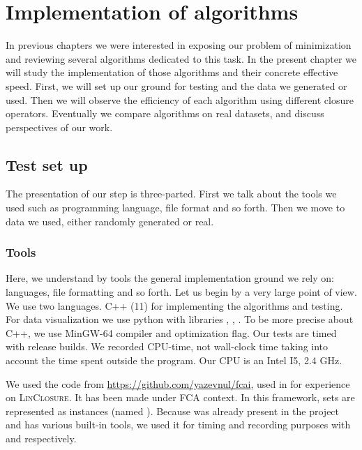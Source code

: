 \chapter{Implementation of algorithms}

In previous chapters we were interested in exposing our problem of minimization
and reviewing several algorithms dedicated to this task. In the present chapter we will study the implementation of those algorithms and their concrete effective speed. First, we will set up our ground for testing and the data we generated or used. Then we will observe the efficiency of each algorithm using 
different closure operators. Eventually we compare algorithms on real datasets,
and discuss perspectives of our work.

\section{Test set up}

The presentation of our step is three-parted. First we talk about the tools we used such as programming language, file format and so forth. Then we move to 
data we used, either randomly generated or real.

\subsection{Tools}

Here, we understand by tools the general implementation ground we rely on:
languages, file formatting and so forth. Let us begin by
a very large point of view. We use two languages. C++ (11) for implementing
the algorithms and testing. For data visualization we use python with libraries , , . To be more precise about C++, 
we use MinGW-64 compiler and  optimization flag. Our tests are timed
with release builds. We recorded CPU-time, not wall-clock time taking into account the time spent outside the program. Our CPU is an Intel I5, 2.4 GHz.

\vspace{1.2em}

We used the code from \url{https://github.com/yazevnul/fcai}, used in 
\cite{bazhanov_optimizations_2014} for experience on \textsc{LinClosure}. It has been made under FCA context. In this framework, sets are represented as  instances (named ). Because 
was already present in the project and has various built-in tools, we used it
for timing and recording purposes with  and  respectively.

